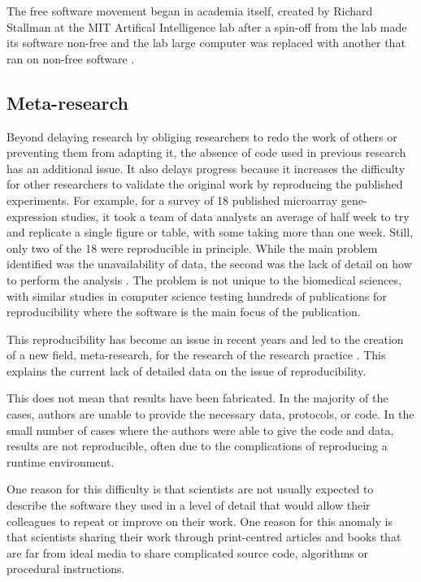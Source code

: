   The free software movement began in academia itself, created by
  Richard Stallman at the MIT Artifical Intelligence lab after a
  spin-off from the lab made its software non-free and the lab large
  computer was replaced with another that ran on non-free software
  \citep{stallman-essays}.

  \subsection{Meta-research}

  Beyond delaying research by obliging researchers to redo the work of
  others or preventing them from adapting it, the absence of code used
  in previous research has an additional issue.
  It also delays progress because it increases the
  difficulty for other researchers to
  validate the original work by reproducing the published experiments.
  For example, for a survey of 18 published microarray gene-expression
  studies, it took a team of data analysts an average of half week to
  try and replicate a single figure or table, with some taking more
  than one week.  Still, only two of the 18 were reproducible in
  principle.  While the main problem identified was the unavailability
  of data, the second was the lack of detail on how to perform the
  analysis \citep{ioannidis2009repeatability}.  The problem is not
  unique to the biomedical sciences, with similar studies in computer
  science testing hundreds of publications for reproducibility where
  the software is the main focus of the publication.

  This reproducibility has become an issue in recent years and led to
  the creation of a new field, meta-research, for the research of the
  research practice \citep{ioannidis2015meta, collins2014researching}.
  This explains the current lack of detailed data on the issue of
  reproducibility.

  This does not mean that results have
  been fabricated.
  In the majority of the cases, authors are
  unable to provide the necessary data, protocols, or code.
  In the small number of cases where the authors
  were able to give the code and data, results are not reproducible,
  often due to the complications of reproducing a runtime environment.

  One reason for this difficulty is that
  scientists are not usually expected to describe
  the software they used in a level of detail that would allow
  their colleagues to repeat or improve on their work.
  One reason for this anomaly is that
  scientists sharing their work through print-centred articles
  and books that are far from ideal media to share complicated source
  code, algorithms or procedural instructions.

